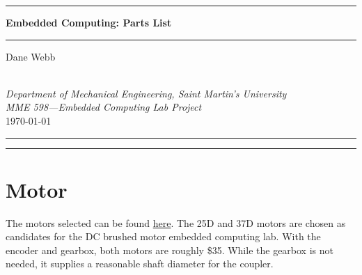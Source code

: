 \documentclass[12pt, onecolumn]{article}
\begin{document}
\thispagestyle{fancy1}


\begin{center}
	\hrule
	\vspace{3pt}
	{\sffamily\bfseries\Large
		Embedded Computing: Parts List
	} \\
	{\color{gray}
		\vspace{3pt}
		\hrule
		\vspace{3pt}
	}
	{
		\hspace*{\fill}
		Dane Webb
		\hspace*{\fill}

	}\\
	\vspace{3pt}
	{\itshape
		\hspace*{\fill}
		Department of Mechanical Engineering, Saint Martin's University
		\hspace*{\fill} \\
		\hspace*{\fill}
		MME 598---Embedded Computing Lab Project
		\hspace*{\fill}
	}\\
	\vspace{3pt}
	{
		\hspace*{\fill}
		\today{} %
		\hspace*{\fill}
	}
	\vspace{3pt}
	{\color{gray}\hrule}
\end{center}

\vspace{9pt}
\hrule
\vspace{1\baselineskip}



\section{Motor}
\tag{}

The motors selected can be found \href{https://www.pololu.com/category/51/pololu-metal-gearmotors}{here}. The 25D and 37D motors are chosen as candidates for the DC brushed motor embedded computing lab. With the encoder and gearbox, both motors are roughly \$35. While the gearbox is not needed, it supplies a reasonable shaft diameter for the coupler.
\end{document}
